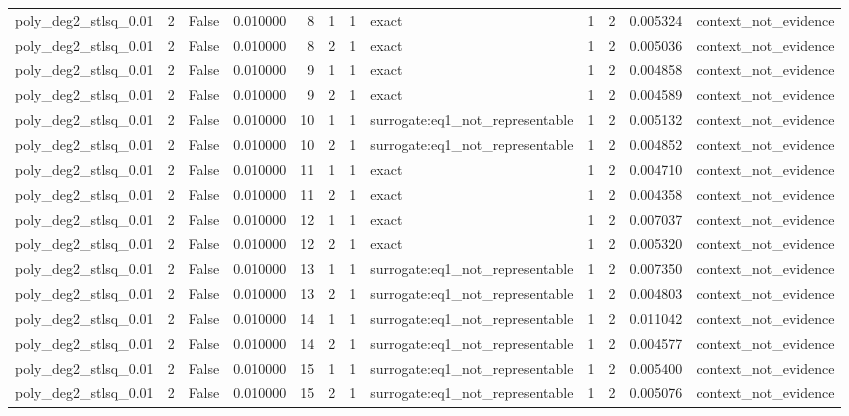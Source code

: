 \begin{tabular}{lrrrrrrlrrrl}
poly\_deg2\_stlsq\_0.01 & 2 & False & 0.010000 & 8 & 1 & 1 & exact & 1 & 2 & 0.005324 & context\_not\_evidence \\
poly\_deg2\_stlsq\_0.01 & 2 & False & 0.010000 & 8 & 2 & 1 & exact & 1 & 2 & 0.005036 & context\_not\_evidence \\
poly\_deg2\_stlsq\_0.01 & 2 & False & 0.010000 & 9 & 1 & 1 & exact & 1 & 2 & 0.004858 & context\_not\_evidence \\
poly\_deg2\_stlsq\_0.01 & 2 & False & 0.010000 & 9 & 2 & 1 & exact & 1 & 2 & 0.004589 & context\_not\_evidence \\
poly\_deg2\_stlsq\_0.01 & 2 & False & 0.010000 & 10 & 1 & 1 & surrogate:eq1\_not\_representable & 1 & 2 & 0.005132 & context\_not\_evidence \\
poly\_deg2\_stlsq\_0.01 & 2 & False & 0.010000 & 10 & 2 & 1 & surrogate:eq1\_not\_representable & 1 & 2 & 0.004852 & context\_not\_evidence \\
poly\_deg2\_stlsq\_0.01 & 2 & False & 0.010000 & 11 & 1 & 1 & exact & 1 & 2 & 0.004710 & context\_not\_evidence \\
poly\_deg2\_stlsq\_0.01 & 2 & False & 0.010000 & 11 & 2 & 1 & exact & 1 & 2 & 0.004358 & context\_not\_evidence \\
poly\_deg2\_stlsq\_0.01 & 2 & False & 0.010000 & 12 & 1 & 1 & exact & 1 & 2 & 0.007037 & context\_not\_evidence \\
poly\_deg2\_stlsq\_0.01 & 2 & False & 0.010000 & 12 & 2 & 1 & exact & 1 & 2 & 0.005320 & context\_not\_evidence \\
poly\_deg2\_stlsq\_0.01 & 2 & False & 0.010000 & 13 & 1 & 1 & surrogate:eq1\_not\_representable & 1 & 2 & 0.007350 & context\_not\_evidence \\
poly\_deg2\_stlsq\_0.01 & 2 & False & 0.010000 & 13 & 2 & 1 & surrogate:eq1\_not\_representable & 1 & 2 & 0.004803 & context\_not\_evidence \\
poly\_deg2\_stlsq\_0.01 & 2 & False & 0.010000 & 14 & 1 & 1 & surrogate:eq1\_not\_representable & 1 & 2 & 0.011042 & context\_not\_evidence \\
poly\_deg2\_stlsq\_0.01 & 2 & False & 0.010000 & 14 & 2 & 1 & surrogate:eq1\_not\_representable & 1 & 2 & 0.004577 & context\_not\_evidence \\
poly\_deg2\_stlsq\_0.01 & 2 & False & 0.010000 & 15 & 1 & 1 & surrogate:eq1\_not\_representable & 1 & 2 & 0.005400 & context\_not\_evidence \\
poly\_deg2\_stlsq\_0.01 & 2 & False & 0.010000 & 15 & 2 & 1 & surrogate:eq1\_not\_representable & 1 & 2 & 0.005076 & context\_not\_evidence \\

\end{tabular}

